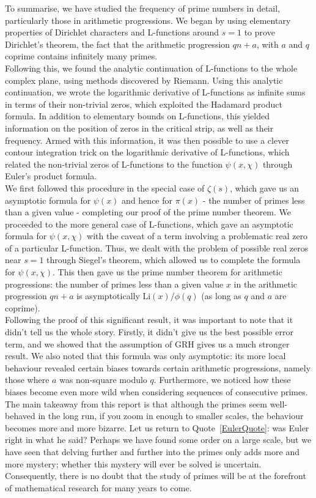 To summarise, we have studied the frequency of prime numbers in detail, particularly  those in arithmetic progressions. We began by using elementary properties of Dirichlet characters and L-functions around $s = 1$ to prove Dirichlet's theorem, the fact that the arithmetic progression $qn + a$, with $a$ and $q$ coprime contains infinitely many primes. \\

Following this, we found the analytic continuation of L-functions to the whole complex plane, using methods discovered by Riemann. Using this analytic continuation, we wrote the logarithmic derivative of L-functions as infinite sums in terms of their non-trivial zeros, which exploited the Hadamard product formula. In addition to elementary bounds on L-functions, this yielded information on the position of zeros in the critical strip, as well as their frequency. Armed with this information, it was then possible to use a clever contour integration trick on the logarithmic derivative of L-functions, which related the non-trivial zeros of L-functions to the function $\psi(x, \chi)$ through Euler's product formula. \\

We first followed this procedure in the special case of $\zeta(s)$, which gave us an asymptotic formula for $\psi(x)$ and hence for $\pi(x)$ - the number of primes less than a given value - completing our proof of the prime number theorem. We proceeded to the more general case of L-functions, which gave an asymptotic formula for $\psi(x, \chi)$ with the caveat of a term involving a problematic real zero of a particular L-function. Thus, we dealt with the problem of possible real zeros near $s = 1$ through Siegel's theorem, which allowed us to complete the formula for $\psi(x, \chi)$. This then gave us the prime number theorem for arithmetic progressions: the number of primes less than a given value $x$ in the arithmetic progression $qn + a$ is asymptotically $\textrm{Li}(x)/\phi(q)$ (as long as $q$ and $a$ are coprime). \\

Following the proof of this significant result, it was important to note that it didn't tell us the whole story. Firstly, it didn't give us the best possible error term, and we showed that the assumption of GRH gives us a much stronger result. We also noted that this formula was only asymptotic: its more local behaviour revealed certain biases towards certain arithmetic progressions, namely those where $a$ was non-square modulo $q$. Furthermore, we noticed how these biases become even more wild when considering sequences of consecutive primes. \\

The main takeaway from this report is that although the primes seem well-behaved in the long run, if you zoom in enough to smaller scales, the behaviour becomes more and more bizarre. Let us return to Quote~\ref{EulerQuote}: was Euler right in what he said? Perhaps we have found some order on a large scale, but we have seen that delving further and further into the primes only adds more and more mystery; whether this mystery will ever be solved is uncertain. Consequently, there is no doubt that the study of primes will be at the forefront of mathematical research for many years to come.
